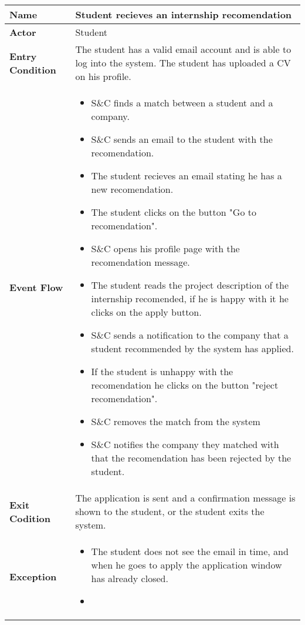 \begin{longtable}{|p{}|p{}|}
\hline
\textbf{Name} &  Student recieves an internship recomendation\\
\hline
\textbf{Actor} &  Student\\
\hline
\textbf{Entry Condition} &  The student has a valid email account and is able to log into the system. The student has uploaded a CV on his profile.\\
\hline
\textbf{Event Flow} &  
\begin{itemize}
\item S\&C finds a match between a student and a company.
\item S\&C sends an email to the student with the recomendation.
\item The student recieves an email stating he has a new recomendation.
\item The student clicks on the button "Go to recomendation".
\item S\&C opens his profile page with the recomendation message.
\item The student reads the project description of the internship recomended, if he is happy with it he clicks on the apply button.
\item S\&C sends a notification to the company that a student recommended by the system has applied.
\item If the student is unhappy with the recomendation he clicks on the button "reject recomendation".
\item S\&C removes the match from the system
\item S\&C notifies the company they matched with that the recomendation has been rejected by the student. 
\end{itemize}
\\
\hline
\textbf{Exit Codition} & The application is sent and a confirmation message is shown to the student, or the student exits the system.\\
\hline
\textbf{Exception} &  
\begin{itemize}
    \item The student does not see the email in time, and when he goes to apply the application window has already closed.
    \item 
\end{itemize}\\
\hline
\end{longtable}



